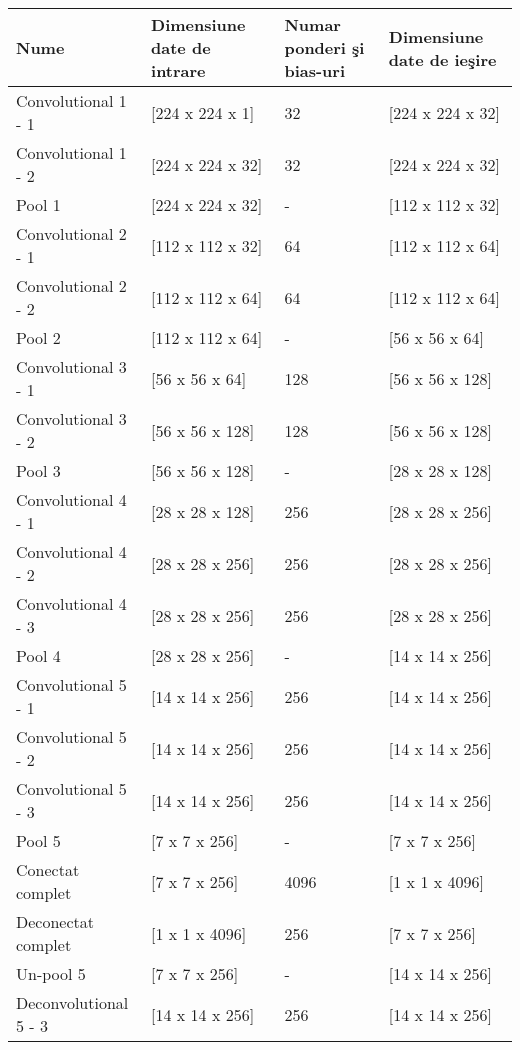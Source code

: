 \begin{center}
 \begin{longtable}{|p{4cm}|p{3cm}|p{3cm}|p{3cm}|} 
 \hline
 Nume & Dimensiune date de intrare & Numar ponderi \c{s}i bias-uri & Dimensiune date de ie\c{s}ire \\ [0.5ex] 
 \hline\hline
 Convolutional 1 - 1 &  [224 x 224 x 1] & 32 & [224 x 224 x 32] \\ 
 \hline
 Convolutional 1 - 2 & [224 x 224 x 32] & 32 & [224 x 224 x 32] \\
 \hline
 Pool 1 & [224 x 224 x 32] & - & [112 x 112 x 32] \\
 \hline
 Convolutional 2 - 1 & [112 x 112 x 32] & 64 & [112 x 112 x 64] \\
 \hline
 Convolutional 2 - 2 & [112 x 112 x 64] & 64 & [112 x 112 x 64] \\
 \hline
 Pool 2 & [112 x 112 x 64] & - & [56 x 56 x 64] \\
 \hline
 Convolutional 3 - 1 & [56 x 56 x 64] & 128 & [56 x 56 x 128] \\
 \hline
 Convolutional 3 - 2 & [56 x 56 x 128] & 128 & [56 x 56 x 128] \\
 \hline
 Pool 3 & [56 x 56 x 128] & - & [28 x 28 x 128] \\
 \hline
 Convolutional 4 - 1 & [28 x 28 x 128] & 256 & [28 x 28 x 256] \\
 \hline
 Convolutional 4 - 2 & [28 x 28 x 256] & 256 & [28 x 28 x 256] \\
 \hline
 Convolutional 4 - 3 & [28 x 28 x 256] & 256 & [28 x 28 x 256] \\
 \hline
 Pool 4 & [28 x 28 x 256] & - & [14 x 14 x 256] \\
 \hline
 Convolutional 5 - 1 & [14 x 14 x 256] & 256 & [14 x 14 x 256] \\
 \hline
 Convolutional 5 - 2 & [14 x 14 x 256] & 256 & [14 x 14 x 256] \\
 \hline
 Convolutional 5 - 3 & [14 x 14 x 256] & 256 & [14 x 14 x 256] \\
 \hline
 Pool 5 & [7 x 7 x 256] & - & [7 x 7 x 256] \\
 \hline
 Conectat complet & [7 x 7 x 256] & 4096 & [1 x 1 x 4096] \\
 \hline
 Deconectat complet & [1 x 1 x 4096] & 256 & [7 x 7 x 256] \\
 \hline
 Un-pool 5  & [7 x 7 x 256] & - & [14 x 14 x 256] \\
 \hline
 Deconvolutional 5 - 3 & [14 x 14 x 256] & 256 & [14 x 14 x 256] \\

\end{longtable}
\end{center}
